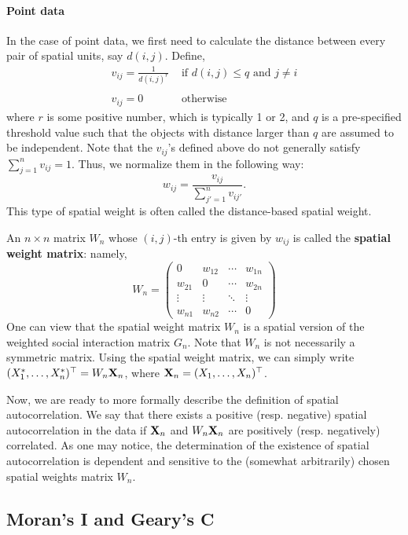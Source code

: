 \documentclass[11pt, A4paper, openany, uplatex]{book}
\begin{document}
\paragraph{Point data}
In the case of point data, we first need to calculate the distance between every pair of spatial units, say $d(i,j)$.
Define,
\[
	\begin{array}{ll}
	v_{ij} = \frac{1}{d(i,j)^r}& \text{ if $d(i,j) \leq q $ and $j \neq i$} \\
	& \\
	v_{ij} = 0 &  \text{ otherwise } 
	\end{array}
\]
where $r$ is some positive number, which is typically 1 or 2, and $q$ is a pre-specified threshold value such that the objects with distance larger than $q$ are assumed to be independent.
Note that the $v_{ij}$'s defined above do not generally satisfy $\sum_{j = 1}^n v_{ij} = 1$.
Thus, we normalize them in the following way:
\[
	w_{ij} = \frac{v_{ij}}{\sum_{j' = 1}^n v_{ij'}}.
\]
This type of spatial weight is often called the distance-based spatial weight.
\bigskip

An $n \times n$ matrix $W_n$ whose $(i,j)$-th entry is given by $w_{ij}$ is called the \textbf{spatial weight matrix}: namely,
\[
	W_n = \left(\begin{array}{cccc}
		0            & w_{12} & \cdots & w_{1n} \\
		w_{21} &  0           & \cdots & w_{2n} \\
		\vdots    & \vdots    & \ddots & \vdots \\
		w_{n1} & w_{n2} & \cdots & 0
		\end{array}\right)
\]
One can view that the spatial weight matrix $W_n$ is a spatial version of the weighted social interaction matrix $G_n$.
Note that $W_n$ is not necessarily a symmetric matrix.
Using the spatial weight matrix, we can simply write $(X^*_1, \ldots, X_n^*)^\top = W_n \mathbf{X}_n$, where  $\mathbf{X}_n = (X_1, \ldots, X_n)^\top$.
\bigskip

Now, we are ready to more formally describe the definition of spatial autocorrelation.
We say that there exists a positive (resp. negative) spatial autocorrelation in the data if $\mathbf{X}_n$ and $W_n \mathbf{X}_n$ are positively (resp. negatively) correlated.
As one may notice, the determination of the existence of spatial autocorrelation is dependent and sensitive to the (somewhat arbitrarily) chosen spatial weights matrix $W_n$.

\subsection{Moran's I and Geary's C}
\end{document}
